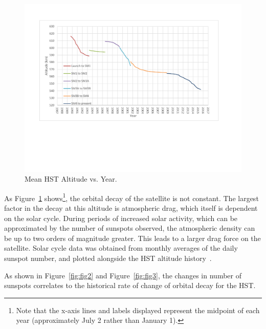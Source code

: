 \documentclass[paper=letter, fontsize=11pt]{scrartcl} %
\numberwithin{equation}{section} %
\numberwithin{figure}{section} %
\numberwithin{table}{section} %
\begin{document}
\begin{figure}[H]
    \begin{center}
        \includegraphics[width=1\textwidth]{figs2/1.pdf}
        \caption{Mean HST Altitude vs. Year.}
        \label{fig:fig1}
    \end{center}
\end{figure}

As Figure~\ref{fig:fig1} shows\footnote{Note that the x-axis lines and labels displayed represent the midpoint of each year (approximately July 2 rather than January 1).}, the orbital decay of the satellite is not constant. The largest factor in the decay at this altitude is atmospheric drag, which itself is dependent on the solar cycle. During periods of increased solar activity, which can be approximated by the number of sunspots observed, the atmospheric density can be up to two orders of magnitude greater. This leads to a larger drag force on the satellite. Solar cycle data was obtained from monthly averages of the daily sunspot number, and plotted alongside the HST altitude history~\cite{sunspots}.

As shown in Figure~\ref{fig:fig2} and Figure~\ref{fig:fig3}, the changes in number of sunspots correlates to the historical rate of change of orbital decay for the HST.
\end{document}
